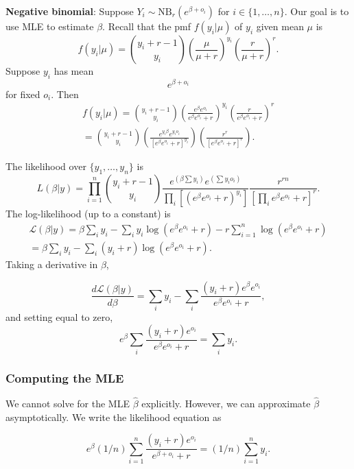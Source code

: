 \documentclass[12pt]{article}
\begin{document}
\textbf{Negative binomial}: Suppose $Y_i \sim \textrm{NB}_r(e^{\beta + o_i})$ for $i \in \{ 1, \dots, n \}$. Our goal is to use MLE to estimate $\beta$. Recall that the pmf $f(y_i | \mu)$ of $y_i$ given mean $\mu$ is
$$ f(y_i | \mu) = \binom{y_i + r - 1}{y_i} \left( \frac{ \mu }{ \mu + r } \right)^{y_i} \left( \frac{ r }{ \mu + r }  \right)^r.$$ Suppose $y_i$ has mean $$e^{\beta + o_i}$$ for fixed $o_i$. Then 
\begin{multline*}
f(y_i | \mu) = \binom{y_i + r - 1}{y_i} \left( \frac{ e^{\beta} e^{o_i} }{ e^{\beta}e^{o_i} + r } \right)^{y_i} \left( \frac{ r }{ e^{\beta}e^{o_i} + r } \right)^r \\ = \binom{y_i + r - 1}{y_i} \left( \frac{ e^{y_i\beta} e^{y_i o_i} }{ [e^\beta e^{o_i} + r]^{y_i} } \right) \left( \frac{r^r}{[e^{\beta} e^{o_i} + r ]^r} \right).
\end{multline*}

The likelihood over $\{y_1, \dots, y_n\}$ is
$$ L(\beta | y) = \prod_{i=1}^n \binom{ y_i + r - 1 }{ y_i }  \frac{ e^{ (\beta \sum y_i)} e^{\left(\sum y_i o_i \right)} }{  \prod_{i} \left[ \left( e^\beta e^{o_i} + r \right)^{y_i} \right] } \frac{ r^{rn} }{ \left[ \prod_i e^{\beta} e^{o_i} + r \right]^r }.$$
 The log-likelihood (up to a constant) is
 \begin{multline*} \mathcal{L}(\beta | y) = \beta \sum_i y_i - \sum_{i}  y_i \log\left( e^\beta e^{o_i} + r \right) - r \sum_{i=1}^n \log( e^{\beta} e^{o_i} + r ) \\ = \beta \sum_{i} y_i - \sum_{i} (y_i + r) \log ( e^\beta e^{o_i} + r ). \end{multline*} Taking a derivative in $\beta$, 

$$ \frac{ d \mathcal{L} (\beta | y) }{ d \beta } = \sum_i y_i - \sum_i \frac{ (y_i + r) e^\beta e^{o_i} }{ e^\beta e^{o_i} + r },$$ and setting equal to zero,
 $$ e^\beta \sum_i \frac{ (y_i + r) e^{o_i} }{ e^\beta e^{o_i} + r  }  = \sum_i y_i.$$ 
 
 \subsubsection{Computing the MLE}
 
 We cannot solve for the MLE $\hat{\beta}$ explicitly. However, we can approximate $\hat{\beta}$ asymptotically. We write the likelihood equation as
 
 $$e^\beta  (1/n) \sum_{i=1}^n \frac{ (y_i + r)e^{o_i} }{ e^{\beta + o_i} + r } = (1/n) \sum_{i=1}^n y_i.$$ 
 
\end{document}
